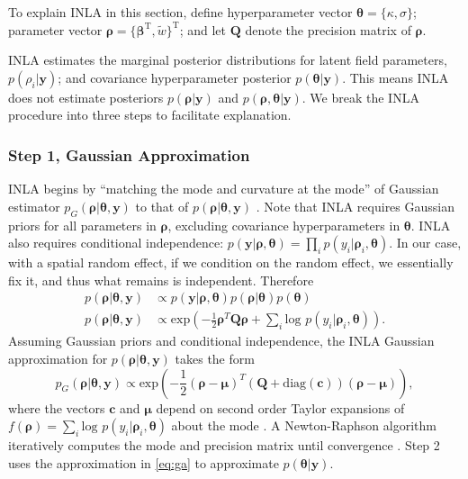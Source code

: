 To explain INLA in this section, define hyperparameter vector $\pmb{\theta} = \{\kappa, \sigma \}$; parameter vector $\pmb{\rho} = \{ \pmb{\beta}^{\text{T}}, \widetilde{w} \}^{\text{T}}$; and let $\pmb{Q}$ denote the precision matrix of $\pmb{\rho}$.

INLA estimates the marginal posterior distributions for latent field parameters, $p(\rho_{i}|\pmb{y})$; and covariance hyperparameter posterior $p(\pmb{\theta}|\pmb{y})$. This means INLA does not estimate posteriors $p(\pmb{\rho}|\pmb{y})$ and $p(\pmb{\rho},\pmb{\theta}|\pmb{y})$. We break the INLA procedure into three steps to facilitate explanation.

\subsubsection{Step 1, Gaussian Approximation} %

INLA begins by ``matching the mode and curvature at the mode'' of Gaussian estimator $p_{G}(\pmb{\rho}|\pmb{\theta}, \pmb{y})$ to that of $p(\pmb{\rho}|\pmb{\theta}, \pmb{y})$ \citep{Rue2005}. Note that INLA requires Gaussian priors for all parameters in $\pmb{\rho}$, excluding covariance hyperparameters in $\pmb{\theta}$. INLA also requires conditional independence: $p(\pmb{y}|\pmb{\rho}, \pmb{\theta}) = \prod_{i} p(y_{i}|\pmb{\rho}_{i},\pmb{\theta})$. In our case, with a spatial random effect, if we condition on the random effect, we essentially fix it, and thus what remains is independent. Therefore 
\begin{align}
p(\pmb{\rho} |\pmb{\theta},\pmb{y}) & \propto p(\pmb{y}|\pmb{\rho}, \pmb{\theta}) p(\pmb{\rho}|\pmb{\theta}) p(\pmb{\theta}) \nonumber \\
p(\pmb{\rho}|\pmb{\theta},\pmb{y}) & \propto \text{exp}\left(-\frac{1}{2}\pmb{\rho}^{T}\pmb{Q \rho} + \sum_{i} \text{log }p(y_{i}|\pmb{\rho}_{i},\pmb{\theta}) \right). \nonumber
\end{align}
Assuming Gaussian priors and conditional independence, the INLA Gaussian approximation for $p(\pmb{\rho}|\pmb{\theta}, \pmb{y})$ takes the form
\begin{equation} \label{eq:ga}
p_{G}(\pmb{\rho}|\pmb{\theta},\pmb{y}) \propto \text{exp} \left( -\frac{1}{2}(\pmb{\rho-\mu})^{T} (\pmb{Q} + \text{diag}(\pmb{c}) ) (\pmb{\rho - \mu}) \right),
\end{equation}
where the vectors $\pmb{c}$ and $\pmb{\mu}$ depend on second order Taylor expansions of $f(\pmb{\rho}) = \sum_{i} \text{log }p(y_{i}|\pmb{\rho}_{i},\pmb{\theta})$ about the mode \citep{Lindstrom2014}. A Newton-Raphson algorithm iteratively computes the mode and precision matrix until convergence \citep{Rue2009}. Step 2 uses the approximation in \ref{eq:ga} to approximate $p(\pmb{\theta}|\pmb{y})$.

